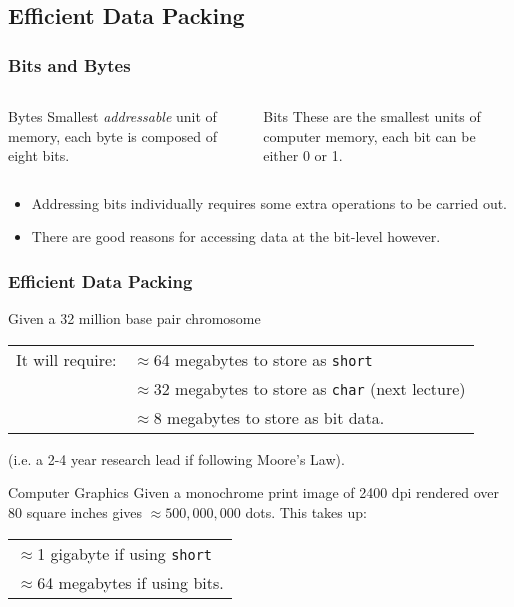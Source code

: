 \documentclass[smaller,table]{beamer} %
\begin{document}
\subsection{Efficient Data Packing}
\begin{frame}
\frametitle{Bits and Bytes}
\begin{columns}
\begin{column}{5cm}
\begin{block}{Bytes}
Smallest \emph{addressable} unit of memory, each byte is composed of eight bits.
\end{block}
\end{column}
\begin{column}{5cm}
\begin{block}{Bits}
These are the smallest units of computer memory, each bit can be either 0 or 1.
\end{block}
\end{column}
\end{columns}
\vspace{0.2in}
\begin{itemize}
\item Addressing bits individually requires some extra operations to be carried out.
\item There are good reasons for accessing data at the bit-level however.
\end{itemize}
\end{frame}

\begin{frame}
\frametitle{Efficient Data Packing}
\begin{block}{Given a 32 million base pair chromosome}
\begin{tabular}{l l}
It will require: &$\approx$64 megabytes to store as {\tt short}\\
&$\approx$32 megabytes to store as {\tt char} (next lecture)\\
&$\approx$8 megabytes to store as bit data.
\end{tabular}
(i.e. a 2-4 year research lead if following Moore's Law).
\end{block}
\begin{block}{Computer Graphics}
Given a monochrome print image of 2400 dpi rendered over 80 square inches gives $\approx 500,000,000$ dots. This takes up:
\begin{center}
\begin{tabular}{l}
$\approx$1 gigabyte if using {\tt short}\\
$\approx$64 megabytes if using bits.
\end{tabular}
\end{center}
\end{block}
\end{frame}
\end{document}
